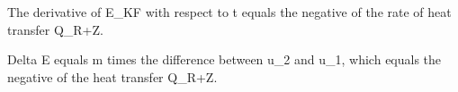 The derivative of E_KF with respect to t equals the negative of the rate of heat transfer Q_R+Z.

Delta E equals m times the difference between u_2 and u_1, which equals the negative of the heat transfer Q_R+Z.